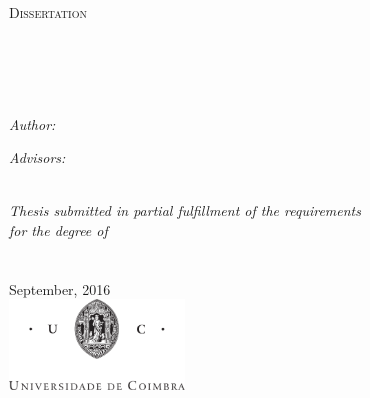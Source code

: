 \documentclass[11pt, a4paper, oneside]{thesis} %
\begin{document}
\begin{titlepage}
\begin{center}

\textsc{\LARGE \univname}\\[1.5cm] %
\textsc{\Large Dissertation}\\[0.5cm] %
\textsc{}\\[0.5cm] %

\HRule \\[0.4cm] %
{\huge \bfseries \ttitle}\\[0.4cm] %
\HRule \\[1.5cm] %
 
\begin{minipage}{0.4\textwidth}
\begin{flushleft} \large
\emph{Author:}\\
\authornames %
\end{flushleft}
\end{minipage}
\begin{minipage}{0.5\textwidth}
\begin{flushright} \large
\emph{Advisors:} \\
\supname %
\end{flushright}
\end{minipage}\\[3cm]
 
\large \textit{Thesis submitted in partial fulfillment of the requirements\\ for the degree of \degreename}\\[0.3cm] %

\facname\\\deptname\\[2cm] %
 
{\large September, 2016}\\[2cm] %
\includegraphics[height=24mm]{Figures/MARCA_UC_LET_PRETO} 
\vfill
\end{center}

\end{titlepage}
\end{document}
